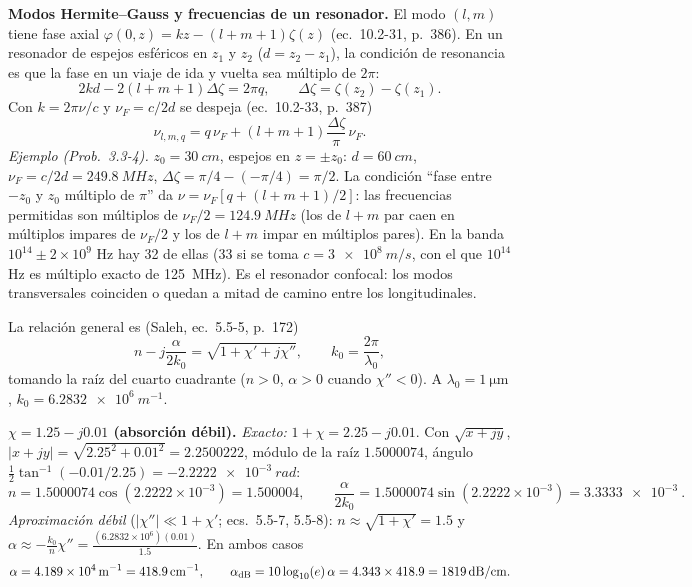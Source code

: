  \textbf{Modos Hermite--Gauss y frecuencias de un resonador.} El modo $(l,m)$ tiene fase axial
$\varphi(0,z)=kz-(l+m+1)\zeta(z)$ (ec.~10.2-31, p.~386). En un resonador de espejos esféricos en $z_1$ y $z_2$
($d=z_2-z_1$), la condición de resonancia es que la fase en un viaje de ida y vuelta sea múltiplo
de $2\pi$:
\[
2kd-2(l+m+1)\Delta\zeta=2\pi q,\qquad \Delta\zeta=\zeta(z_2)-\zeta(z_1).
\]
Con $k=2\pi\nu/c$ y $\nu_F=c/2d$ se despeja (ec.~10.2-33, p.~387)
\[
\nu_{l,m,q}=q\,\nu_F+(l+m+1)\frac{\Delta\zeta}{\pi}\,\nu_F .
\]
\emph{Ejemplo (Prob.~3.3-4).} $z_0=\SI{30}{cm}$, espejos en $z=\pm z_0$: $d=\SI{60}{cm}$,
$\nu_F=c/2d=\SI{249.8}{MHz}$, $\Delta\zeta=\pi/4-(-\pi/4)=\pi/2$. La condición ``fase entre $-z_0$ y $z_0$
múltiplo de $\pi$'' da $\nu=\nu_F[q+(l+m+1)/2]$: las frecuencias permitidas son múltiplos de
$\nu_F/2=\SI{124.9}{MHz}$ (los de $l+m$ par caen en múltiplos impares de $\nu_F/2$ y los de $l+m$ impar
en múltiplos pares). En la banda $10^{14}\pm2\times10^9$ Hz hay 32 de ellas (33 si se toma
$c=\SI{3e8}{m/s}$, con el que $10^{14}$ Hz es múltiplo exacto de \SI{125}{MHz}). Es el resonador
confocal: los modos transversales coinciden o quedan a mitad de camino entre los longitudinales.


\label{sol:12}

La relación general es (Saleh, ec.~5.5-5, p.~172)
\[
n-j\frac{\alpha}{2k_0}=\sqrt{1+\chi'+j\chi''},\qquad k_0=\frac{2\pi}{\lambda_0},
\]
tomando la raíz del cuarto cuadrante ($n>0$, $\alpha>0$ cuando $\chi''<0$). A $\lambda_0=\SI{1}{\um}$,
$k_0=\SI{6.2832e6}{m^{-1}}$.

 \textbf{$\chi=1.25-j0.01$ (absorción débil).} \emph{Exacto:} $1+\chi=2.25-j0.01$. Con
$\sqrt{x+jy}$, $|x+jy|=\sqrt{2.25^2+0.01^2}=2.2500222$, módulo de la raíz $1.5000074$, ángulo
$\tfrac12\tan^{-1}(-0.01/2.25)=\SI{-2.2222e-3}{rad}$:
\[
n=1.5000074\cos(2.2222\times10^{-3})=1.500004,\qquad
\frac{\alpha}{2k_0}=1.5000074\sin(2.2222\times10^{-3})=\SI{3.3333e-3}{}.
\]
\emph{Aproximación débil} ($|\chi''|\ll1+\chi'$; ecs.~5.5-7, 5.5-8):
$n\approx\sqrt{1+\chi'}=1.5$ y $\alpha\approx-\frac{k_0}{n}\chi''=\frac{(6.2832\times10^6)(0.01)}{1.5}$.
En ambos casos
\[
\alpha=\SI{4.189e4}{m^{-1}}=\SI{418.9}{cm^{-1}},\qquad
\alpha_{\rm dB}=10\log_{10}(e)\,\alpha=4.343\times418.9=\SI{1819}{dB/cm}.
\]

